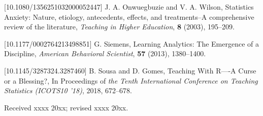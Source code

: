 \documentclass{aims}
\theoremstyle{definition}
\begin{document}
\begin{thebibliography}{99}
 [10.1080/1356251032000052447]
     \newblock J. A. Onwuegbuzie  and V. A. Wilson,
     \newblock Statistics Anxiety: Nature, etiology, antecedents, effects, and treatments--A comprehensive review of the literature,
     \newblock \emph{Teaching in Higher Education}, \textbf{8} (2003), 195--209.

 [10.1177/0002764213498851]
     \newblock G. Siemens,
     \newblock Learning Analytics: The Emergence of a Discipline,
     \newblock \emph{American Behavioral Scientist}, \textbf{57} (2013), 1380--1400.

 [10.1145/3287324.3287460]
     \newblock B. Sousa and D. Gomes,
     \newblock Teaching With R—-A Curse or a Blessing?,
     \newblock In Proceedings of \emph{the Tenth International Conference on Teaching Statistics (ICOTS10 '18)}, 2018, 672–678.

\end{thebibliography}

\medskip
Received xxxx 20xx; revised xxxx 20xx.
\medskip
\end{document}
